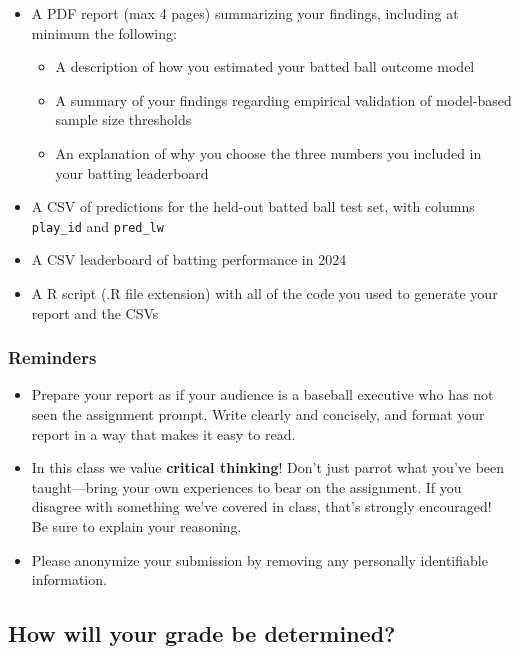 \documentclass{article}
\begin{document}
        \begin{itemize}
          \item A PDF report (max 4 pages) summarizing your findings, including at minimum the following:
          \begin{itemize}
            \item A description of how you estimated your batted ball outcome model
            \item A summary of your findings regarding empirical validation of model-based sample size thresholds
            \item An explanation of why you choose the three numbers you included in your batting leaderboard
          \end{itemize}
          \item A CSV of predictions for the held-out batted ball test set, with columns \texttt{play\_id} and \texttt{pred\_lw}
          \item A CSV leaderboard of batting performance in 2024
          \item A R script (.R file extension) with all of the code you used to generate your report and the CSVs
        \end{itemize}

      \subsubsection*{\sc Reminders}

        \begin{itemize}
          \item Prepare your report as if your audience is a baseball executive who has not seen the assignment prompt. Write clearly and concisely, and format your report in a way that makes it easy to read.
          \item In this class we value {\bf critical thinking}! Don't just parrot what you've been taught---bring your own experiences to bear on the assignment. If you disagree with something we've covered in class, that's strongly encouraged! Be sure to explain your reasoning.
          \item Please anonymize your submission by removing any personally identifiable information.
        \end{itemize}

    \subsection*{\sc How will your grade be determined?}
\end{document}
